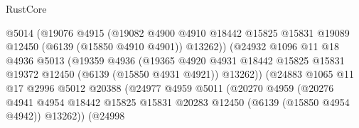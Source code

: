 \begin{lexlean}{RustCore}
\begin{coremodule}
                                    @5014
                                    (@19076
                                      @4915
                                      (@19082
                                        @4900
                                        @4910
                                        @18442
                                        @15825
                                        @15831
                                        @19089
                                        @12450
                                        (@6139 (@15850 @4910 @4901))
                                        @13262))
                                    (@24932
                                      @1096
                                      @11
                                      @18
                                      @4936
                                      @5013
                                      (@19359
                                        @4936
                                        (@19365
                                          @4920
                                          @4931
                                          @18442
                                          @15825
                                          @15831
                                          @19372
                                          @12450
                                          (@6139 (@15850 @4931 @4921))
                                          @13262))
                                      (@24883
                                        @1065
                                        @11
                                        @17
                                        @2996
                                        @5012
                                        @20388
                                        (@24977
                                          @4959
                                          @5011
                                          (@20270
                                            @4959
                                            (@20276
                                              @4941
                                              @4954
                                              @18442
                                              @15825
                                              @15831
                                              @20283
                                              @12450
                                              (@6139 (@15850 @4954 @4942))
                                              @13262))
                                          (@24998

\end{coremodule}
\end{lexlean}
